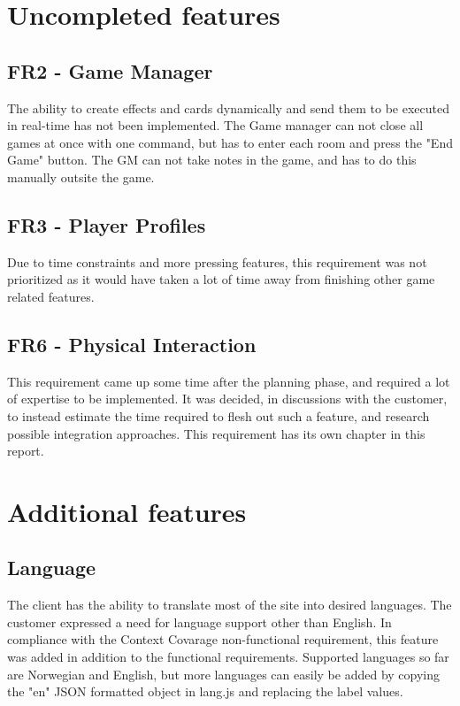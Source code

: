 \section{Uncompleted features}

\subsection{FR2 - Game Manager}
The ability to create effects and cards dynamically and send them to be executed in real-time has not been implemented. The Game manager can not close all games at once with one command, but has to enter each room and press the "End Game" button. The GM can not take notes in the game, and has to do this manually outsite the game.\\

\subsection{FR3 - Player Profiles}
Due to time constraints and more pressing features, this requirement was not prioritized as it would have taken a lot of time away from finishing other game related features.\\

\subsection{FR6 - Physical Interaction}
This requirement came up some time after the planning phase, and required a lot of expertise to be implemented. It was decided, in discussions with the customer, to instead estimate the time required to flesh out such a feature, and research possible integration approaches. This requirement has its own chapter in this report.\\

\section{Additional features}


\subsection{Language}
The client has the ability to translate most of the site into desired languages. The customer expressed a need for language support other than English. In compliance with the Context Covarage non-functional requirement, this feature was added in addition to the functional requirements. Supported languages so far are Norwegian and English, but more languages can easily be added by copying the "en" JSON formatted object in lang.js and replacing the label values.\\

